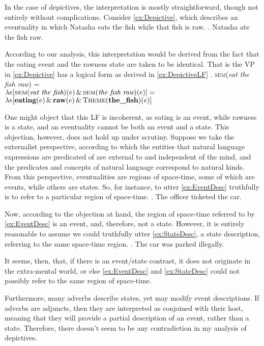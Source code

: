 In the case of depictives, the interpretation is mostly straightforward, though not entirely without complications.
Consider \cref{ex:Depictive}, which describes an eventuality in which Natasha eats the fish while that fish is raw.
\ex. Natasha ate the fish raw.\label{ex:Depictive}

According to our analysis, this interpretation would be derived from the fact that the eating event and the rawness state are taken to be identical.
That is the VP in \cref{ex:Depictive} has a logical form  as derived in \cref{ex:DepictiveLF}
\ex. \textsc{sem}(\textit{eat the fish raw}) =\\
$\lambda e [\textsc{sem}(\textit{eat the fish})(e) \, \&\, \textsc{sem}(\textit{the fish raw})(e)] =$\\
$\lambda e [\textbf{eating}(e)\, \&\, \textbf{raw}(e)\, \&\, \textsc{Theme}(\textbf{the\_fish})(e)]$\label{ex:DepictiveLF}

One might object that this LF is incoherent, as eating is an event, while rawness is a state, and an eventuality cannot be both an event and a state.
This objection, however, does not hold up under scrutiny.
Suppose we take the externalist perspective, according to which the entities that natural language expressions are predicated of are external to and independent of the mind, and the predicates and concepts of natural language correspond to natural kinds.
From this perspective, eventualities are regions of space-time, some of which are events, while others are states.
So, for instance, to utter \cref{ex:EventDesc} truthfully is to refer to a particular region of space-time.
\ex.\label{ex:EventDesc} The officer ticketed the car.

Now, according to the objection at hand, the region of space-time referred to by \cref{ex:EventDesc} is an event, and, therefore, not a state.
However, it is entirely reasonable to assume we could truthfully utter \cref{ex:StateDesc}, a state description, referring to the same space-time region.
\ex.\label{ex:StateDesc} The car was parked illegally.

It seems, then, that, if there is an event/state contrast, it does not originate in the extra-mental world, or else \cref{ex:EventDesc} and \cref{ex:StateDesc} could not possibly refer to the same region of space-time.

Furthermore, many adverbs describe states, yet may modify event descriptions.
If adverbs are adjuncts, then they are interpreted as conjoined with their host, meaning that they will provide a partial description of an event, rather than a state.
Therefore, there doesn't seem to be any contradiction in my analysis of depictives.

